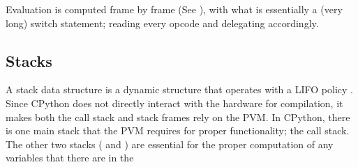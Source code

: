 		Evaluation is computed frame by frame (See {\bfseries{}}), with what is essentially a (very long) switch statement; reading every opcode and delegating accordingly.
			
		\subsection{Stacks}
		\label{subsec:stacks}
		\par A stack data structure is a dynamic structure that operates with a LIFO policy \cite[]{intro2009algorithms}. Since CPython does not directly interact with
		the hardware for compilation, it makes both the call stack and stack frames rely on the PVM. In CPython, there is one main stack that the \acs{PVM} requires for proper functionality; the call stack. 
		The other two stacks ( and ) are essential for the proper computation of any variables that there are in the
